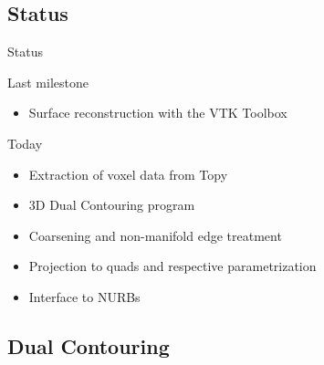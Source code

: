 \subsection{Status}

\begin{frame}{Status}
\begin{block}{Last milestone}
\begin{itemize}
	\item[\textcolor{black}{\VarClock}] Surface reconstruction with the VTK Toolbox

\end{itemize}
\end{block}
\begin{block}{Today}
\begin{itemize}
	\item[\textcolor{green}{\Checkmark}] Extraction of voxel data from Topy
	\item[\textcolor{green}{\Checkmark}] 3D Dual Contouring program 
	\item[\textcolor{green}{\Checkmark}] Coarsening and non-manifold edge treatment 
	\item[\textcolor{green}{\Checkmark}] Projection to quads and respective parametrization
	\item[\textcolor{black}{\VarClock}]  Interface to NURBs
\end{itemize}
\end{block}
\end{frame}






\subsection{Dual Contouring}

